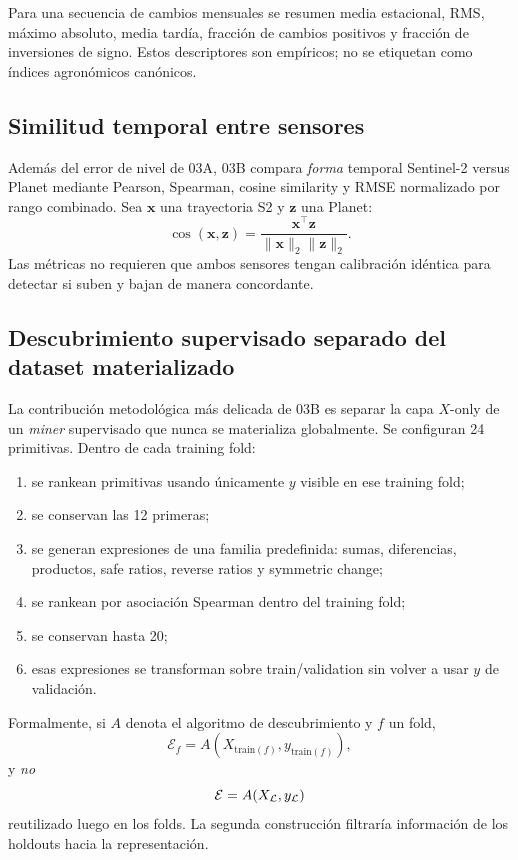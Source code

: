 Para una secuencia de cambios mensuales se resumen media estacional, RMS, máximo absoluto,
media tardía, fracción de cambios positivos y fracción de inversiones de signo. Estos
descriptores son empíricos; no se etiquetan como índices agronómicos canónicos.

\subsection{Similitud temporal entre sensores}

Además del error de nivel de 03A, 03B compara \emph{forma} temporal Sentinel-2 versus Planet
mediante Pearson, Spearman, cosine similarity y RMSE normalizado por rango combinado. Sea
$\bm x$ una trayectoria S2 y $\bm z$ una Planet:
\[
\cos(\bm x,\bm z)
=
\frac{\bm x^\top\bm z}
{\|\bm x\|_2\|\bm z\|_2}.
\]
Las métricas no requieren que ambos sensores tengan calibración idéntica para detectar si
suben y bajan de manera concordante.

\subsection{Descubrimiento supervisado separado del dataset materializado}

La contribución metodológica más delicada de 03B es separar la capa $X$-only de un
\emph{miner} supervisado que nunca se materializa globalmente. Se configuran 24 primitivas.
Dentro de cada training fold:
\begin{enumerate}
\item se rankean primitivas usando únicamente $y$ visible en ese training fold;
\item se conservan las 12 primeras;
\item se generan expresiones de una familia predefinida: sumas, diferencias, productos,
safe ratios, reverse ratios y symmetric change;
\item se rankean por asociación Spearman dentro del training fold;
\item se conservan hasta 20;
\item esas expresiones se transforman sobre train/validation sin volver a usar $y$ de
validación.
\end{enumerate}

Formalmente, si $A$ denota el algoritmo de descubrimiento y $f$ un fold,
\[
\mathcal E_f=A(X_{\mathrm{train}(f)},y_{\mathrm{train}(f)}),
\]
y \emph{no}
\[
\mathcal E=A(X_{\mathcal{L}},y_{\mathcal{L}})
\]
reutilizado luego en los folds. La segunda construcción filtraría información de los holdouts
hacia la representación.

